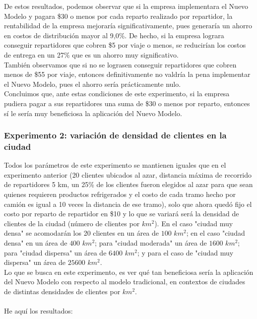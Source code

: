 \documentclass{article}
\begin{document}
    De estos resultados, podemos observar que si la empresa implementara el Nuevo Modelo y pagara \$30 o menos por cada reparto realizado por repartidor, la rentabilidad de la empresa mejoraría significativamente, pues generaría un ahorro en costos de distribución mayor al 9,0\%. De hecho, si la empresa lograra conseguir repartidores que cobren \$5 por viaje o menos, se reducirían los costos de entrega en un 27\% que es un ahorro muy significativo. \\
    También observamos que si no se lograsen conseguir repartidores que cobren menos de \$55 por viaje, entonces definitivamente no valdría la pena implementar el Nuevo Modelo, pues el ahorro sería prácticamente nulo. \\
    Concluimos que, ante estas condiciones de este experimento, si la empresa pudiera pagar a sus repartidores una suma de \$30 o menos por reparto, entonces sí le sería muy beneficiosa la aplicación del Nuevo Modelo.


    \subsubsection{Experimento 2: variación de densidad de clientes en la ciudad}

    Todos los parámetros de este experimento se mantienen iguales que en el experimento anterior (20 clientes ubicados al azar, distancia máxima de recorrido de repartidores 5 km, un 25\% de los clientes fueron elegidos al azar para que sean quienes requieren productos refrigerados y el costo de cada tramo hecho por camión es igual a 10 veces la distancia de ese tramo), solo que ahora quedó fijo el costo por reparto de repartidor en \$10 y lo que se variará será la densidad de clientes de la ciudad (número de clientes por $km^{2}$). En el caso "ciudad muy densa" se acomodarán los 20 clientes en un área de  $100$ $km^{2}$; en el caso "ciudad densa" en un área de $400$ $km^{2}$; para "ciudad moderada" un área de $1600$ $km^{2}$; para "ciudad dispersa" un área de $6400$ $km^{2}$; y para el caso de "ciudad muy dispersa" un área de $25600$ $km^{2}$.  \\
    Lo que se busca en este experimento, es ver qué tan beneficiosa sería la aplicación del Nuevo Modelo con respecto al modelo tradicional, en contextos de ciudades de distintas densidades de clientes por $km^{2}$. \\
    \\
    He aquí los resultados:
\end{document}
